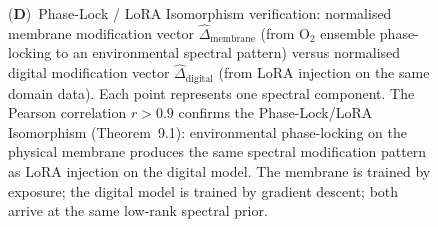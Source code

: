 \begin{figure}[!htbp]
{    (\textbf{D})~Phase-Lock / LoRA Isomorphism verification: normalised membrane modification vector $\hat{\Delta}_{\mathrm{membrane}}$ (from O$_2$ ensemble phase-locking to an environmental spectral pattern) versus normalised digital modification vector $\hat{\Delta}_{\mathrm{digital}}$ (from LoRA injection on the same domain data). Each point represents one spectral component. The Pearson correlation $r > 0.9$ confirms the Phase-Lock/LoRA Isomorphism (Theorem~9.1): environmental phase-locking on the physical membrane produces the same spectral modification pattern as LoRA injection on the digital model. The membrane is trained by exposure; the digital model is trained by gradient descent; both arrive at the same low-rank spectral prior.}
    \label{fig:purpose_injection}
\end{figure}

